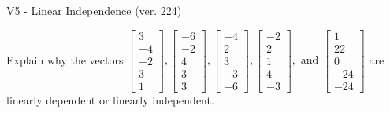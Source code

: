 \begin{exercise}
  \begin{exerciseTitle}V5 - Linear Independence (ver. 224)\end{exerciseTitle}
  \begin{exerciseStatement}
    Explain why the vectors \(\left[\begin{array}{r}
3 \\
-4 \\
-2 \\
3 \\
1
\end{array}\right] , \left[\begin{array}{r}
-6 \\
-2 \\
4 \\
3 \\
3
\end{array}\right] , \left[\begin{array}{r}
-4 \\
2 \\
3 \\
-3 \\
-6
\end{array}\right] , \left[\begin{array}{r}
-2 \\
2 \\
1 \\
4 \\
-3
\end{array}\right] , \text{ and } \left[\begin{array}{r}
1 \\
22 \\
0 \\
-24 \\
-24
\end{array}\right]\) are linearly dependent or linearly independent.	



\end{exerciseStatement}
\end{exercise}
